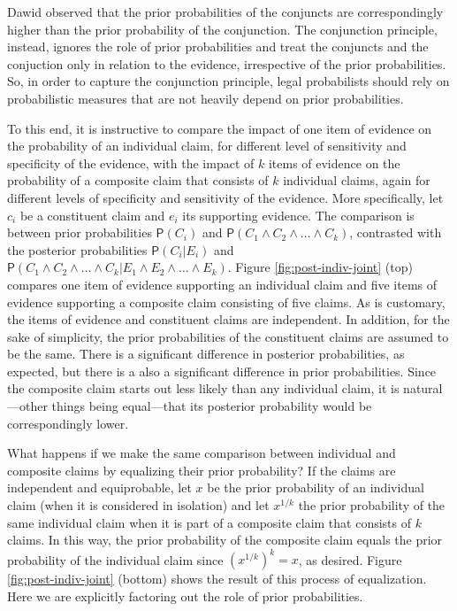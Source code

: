 \documentclass[10pt,dvipsnames,enabledeprecatedfontcommands]{scrartcl}
\newcommand{\pr}[1]{\mathsf{P}(#1)}
\begin{document}
Dawid observed that the prior probabilities of the conjuncts are
correspondingly higher than the prior probability of the conjunction.
The conjunction principle, instead, ignores the role of prior
probabilities and treat the conjuncts and the conjuction only in
relation to the evidence, irrespective of the prior probabilities. So,
in order to capture the conjunction principle, legal probabilists should
rely on probabilistic measures that are not heavily depend on prior
probabilities.

To this end, it is instructive to compare the impact of one item of
evidence on the probability of an individual claim, for different level
of sensitivity and specificity of the evidence, with the impact of \(k\)
items of evidence on the probability of a composite claim that consists
of \(k\) individual claims, again for different levels of specificity
and sensitivity of the evidence. More specifically, let \(c_i\) be a
constituent claim and \(e_i\) its supporting evidence. The comparison is
between prior probabilities \(\pr{C_i}\) and
\(\pr{C_1 \wedge C_2 \wedge \dots \wedge C_k}\), contrasted with the
posterior probabilities \(\pr{C_i \vert E_i}\) and
\(\pr{C_1 \wedge C_2 \wedge \dots \wedge C_k \vert E_1 \wedge E_2 \wedge \dots \wedge E_k}\).
Figure \ref{fig:post-indiv-joint} (top) compares one item of evidence
supporting an individual claim and five items of evidence supporting a
composite claim consisting of five claims. As is customary, the items of
evidence and constituent claims are independent. In addition, for the
sake of simplicity, the prior probabilities of the constituent claims
are assumed to be the same. There is a significant difference in
posterior probabilities, as expected, but there is a also a significant
difference in prior probabilities. Since the composite claim starts out
less likely than any individual claim, it is natural---other things
being equal---that its posterior probability would be correspondingly
lower.

What happens if we make the same comparison between individual and
composite claims by equalizing their prior probability? If the claims
are independent and equiprobable, let \(x\) be the prior probability of
an individual claim (when it is considered in isolation) and let
\(x^{1/k}\) the prior probability of the same individual claim when it
is part of a composite claim that consists of \(k\) claims. In this way,
the prior probability of the composite claim equals the prior
probability of the individual claim since \((x^{1/k})^k=x\), as desired.
Figure \ref{fig:post-indiv-joint} (bottom) shows the result of this
process of equalization. Here we are explicitly factoring out the role
of prior probabilities.
\end{document}
